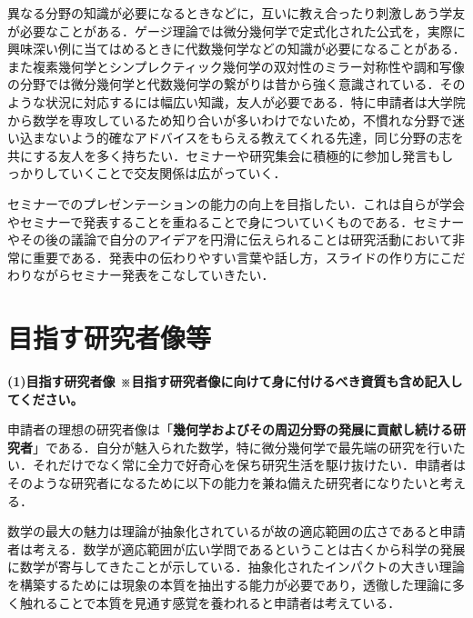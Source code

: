 \documentclass[11pt,a4j,dvipdfmx]{jarticle} 					%
\newcommand{\研究課題名}{象の卵}
\newcommand{\研究機関名}{京都大学}
\newcommand{\研究代表者氏名}{福士謙二}
\begin{document}
\noindent
{}


異なる分野の知識が必要になるときなどに，互いに教え合ったり刺激しあう学友が必要なことがある．ゲージ理論では微分幾何学で定式化された公式を，実際に興味深い例に当てはめるときに代数幾何学などの知識が必要になることがある．また複素幾何学とシンプレクティック幾何学の双対性のミラー対称性や調和写像の分野では微分幾何学と代数幾何学の繋がりは昔から強く意識されている．そのような状況に対応するには幅広い知識，友人が必要である．特に申請者は大学院から数学を専攻しているため知り合いが多いわけでないため，不慣れな分野で迷い込まないよう的確なアドバイスをもらえる教えてくれる先達，同じ分野の志を共にする友人を多く持ちたい．セミナーや研究集会に積極的に参加し発言もしっかりしていくことで交友関係は広がっていく．


\noindent
{}


セミナーでのプレゼンテーションの能力の向上を目指したい．これは自らが学会やセミナーで発表することを重ねることで身についていくものである．セミナーやその後の議論で自分のアイデアを円滑に伝えられることは研究活動において非常に重要である．発表中の伝わりやすい言葉や話し方，スライドの作り方にこだわりながらセミナー発表をこなしていきたい．






\section{目指す研究者像等}

\noindent
\textbf{(1)目指す研究者像 {\footnotesize ※目指す研究者像に向けて身に付けるべき資質も含め記入してください。}}

申請者の理想の研究者像は「\textbf{幾何学およびその周辺分野の発展に貢献し続ける研究者}」である．自分が魅入られた数学，特に微分幾何学で最先端の研究を行いたい．それだけでなく常に全力で好奇心を保ち研究生活を駆け抜けたい．申請者はそのような研究者になるために以下の能力を兼ね備えた研究者になりたいと考える．


\noindent
{}

数学の最大の魅力は理論が抽象化されているが故の適応範囲の広さであると申請者は考える．数学が適応範囲が広い学問であるということは古くから科学の発展に数学が寄与してきたことが示している．抽象化されたインパクトの大きい理論を構築するためには現象の本質を抽出する能力が必要であり，透徹した理論に多く触れることで本質を見通す感覚を養われると申請者は考えている．
\end{document}
